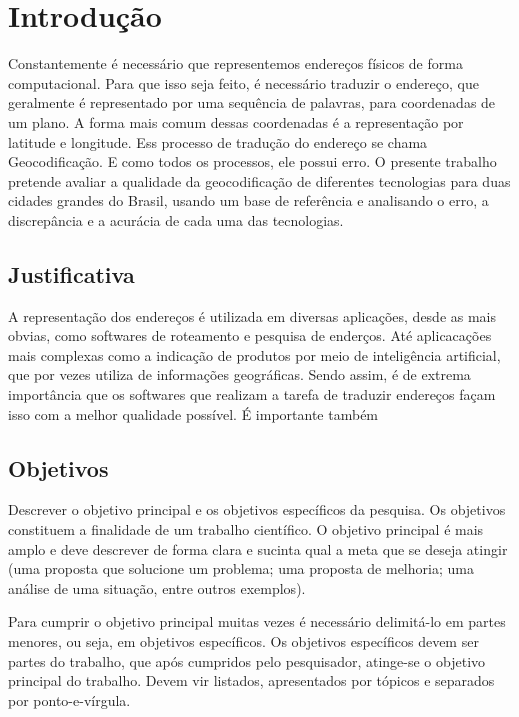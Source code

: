 \chapter{Introdução} \label{Introducao}

Constantemente é necessário que representemos endereços físicos de forma computacional. Para que isso seja feito, é necessário traduzir o endereço, que geralmente é representado por uma sequência de palavras, para coordenadas de um plano. A forma mais comum dessas coordenadas é a representação por latitude e longitude. 
Ess processo de tradução do endereço se chama Geocodificação. E como todos os processos, ele possui erro. 
O presente trabalho pretende avaliar a qualidade da geocodificação de diferentes tecnologias para duas cidades grandes do Brasil, usando um base de referência e analisando o erro, a discrepância e a acurácia de cada uma das tecnologias.

\section{Justificativa}

A representação dos endereços é utilizada em diversas aplicações, desde as mais obvias, como softwares de roteamento e pesquisa de enderços. Até aplicacações mais complexas como a indicação de produtos por meio de inteligência artificial, que por vezes utiliza de informações geográficas. 
Sendo assim, é de extrema importância que os softwares que realizam a tarefa de traduzir endereços façam isso com a melhor qualidade possível. É importante também 

\section{Objetivos}

Descrever o objetivo principal e os objetivos específicos da pesquisa. Os objetivos constituem a finalidade de um trabalho científico. O objetivo principal é mais amplo e deve descrever de forma clara e sucinta qual a meta que se deseja atingir (uma proposta que solucione um problema; uma proposta de melhoria; uma análise de uma situação, entre outros exemplos). 

Para cumprir o objetivo principal muitas vezes é necessário delimitá-lo em partes menores, ou seja, em objetivos específicos. Os objetivos específicos devem ser partes do trabalho, que após cumpridos pelo pesquisador, atinge-se  o objetivo principal do trabalho. Devem vir listados, apresentados por tópicos e separados por ponto-e-vírgula.

